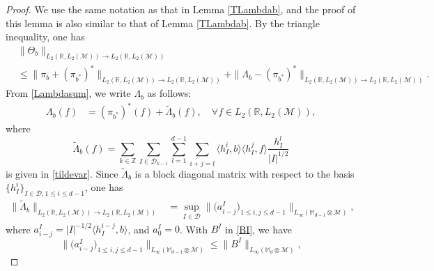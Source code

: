 \documentclass[oneside,english,a4wide]{amsart}
\numberwithin{equation}{section}
\numberwithin{figure}{section}
\theoremstyle{plain}
\theoremstyle{plain}
\theoremstyle{definition}
\theoremstyle{plain}
\theoremstyle{remark}
\theoremstyle{definition}
\theoremstyle{remark}
\theoremstyle{definition}
\newcommand{\8}{\infty}
\begin{document}
\begin{proof}
		We use the same notation as that in Lemma \ref{TLambdab}, and the proof of this lemma is also similar to that of Lemma \ref{TLambdab}. 
	By the triangle inequality, one has
	\begin{equation*}
		\begin{aligned}
			{}&\|\Theta_b\|_{L_2(\mathbb{R},L_2(\mathcal{M}))\to L_2(\mathbb{R},L_2(\mathcal{M}))}\\
			&\le \|\pi_b+(\pi_{b^*})^*\|_{L_2(\mathbb{R},L_2(\mathcal{M}))\to L_2(\mathbb{R},L_2(\mathcal{M}))}+\|\varLambda_b-(\pi_{b^*})^*\|_{L_2(\mathbb{R},L_2(\mathcal{M}))\to L_2(\mathbb{R},L_2(\mathcal{M}))}.
		\end{aligned}
	\end{equation*}
From \eqref{Lambdasum}, we write $\varLambda_b$ as follows:
\begin{equation}\label{var}
	\begin{aligned}
		\varLambda_b(f){}&
		=(\pi_{b^*})^*(f)+\tilde{\varLambda}_b(f), \quad \forall f\in L_2(\mathbb{R},L_2(\mathcal{M})),
	\end{aligned}
\end{equation}
where
\begin{equation*}
	\tilde{\varLambda}_b(f)=\sum_{k\in\mathbb{Z}}\sum_{I\in\mathcal{D}_{k-1}}\sum_{l=1}^{d-1}\sum_{\overline{i+j}=l}\langle h_I^i,b\rangle\langle h_I^j,f\rangle \frac{h_I^l}{|I|^{1/2}}
\end{equation*}
is given in \eqref{tildevar}. Since $\tilde{\varLambda}_b$ is a block diagonal matrix with respect to the basis $\{h_I^i\}_{I\in\mathcal{D}, 1\leq i\leq d-1}$,
one has
\begin{equation*}
	\begin{aligned}
		\|\tilde{\varLambda}_b\|_{L_2(\mathbb{R},L_2(\mathcal{M}))\to L_2(\mathbb{R},L_2(\mathcal{M}))}{}&=\sup_{I\in\mathcal{D}}\biggl\|\biggl(a_{i-j}^I\biggr)_{1\le i,j\le d-1}\biggr\|_{L_\infty(\mathbb{M}_{d-1}\otimes \mathcal{M})},
	\end{aligned}
\end{equation*}
where $a^I_{i-j}=|I|^{-1/2}\langle h_I^{i-j},b\rangle$, and $a_0^I=0$.
With $B^I$ in \eqref{BI}, we have 
\[\biggl\|\biggl(a_{i-j}^I\biggr)_{1\le i,j\le d-1}\biggr\|_{L_\infty(\mathbb{M}_{d-1}\otimes \mathcal{M})}\le \|B^I\|_{L_\infty(\mathbb{M}_{d}\otimes \mathcal{M})},\]

\end{proof}
\end{document}
